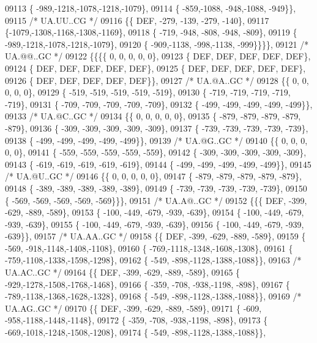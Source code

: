 \begin{DoxyCode}
09113 \{ -989,-1218,-1078,-1218,-1079\},
09114 \{ -859,-1088, -948,-1088, -949\}\},
09115 \textcolor{comment}{/* UA.UU..CG */}
09116 \{\{  DEF, -279, -139, -279, -140\},
09117 \{-1079,-1308,-1168,-1308,-1169\},
09118 \{ -719, -948, -808, -948, -809\},
09119 \{ -989,-1218,-1078,-1218,-1079\},
09120 \{ -909,-1138, -998,-1138, -999\}\}\}\},
09121 \textcolor{comment}{/* UA.@@..GC */}
09122 \{\{\{\{    0,    0,    0,    0,    0\},
09123 \{  DEF,  DEF,  DEF,  DEF,  DEF\},
09124 \{  DEF,  DEF,  DEF,  DEF,  DEF\},
09125 \{  DEF,  DEF,  DEF,  DEF,  DEF\},
09126 \{  DEF,  DEF,  DEF,  DEF,  DEF\}\},
09127 \textcolor{comment}{/* UA.@A..GC */}
09128 \{\{    0,    0,    0,    0,    0\},
09129 \{ -519, -519, -519, -519, -519\},
09130 \{ -719, -719, -719, -719, -719\},
09131 \{ -709, -709, -709, -709, -709\},
09132 \{ -499, -499, -499, -499, -499\}\},
09133 \textcolor{comment}{/* UA.@C..GC */}
09134 \{\{    0,    0,    0,    0,    0\},
09135 \{ -879, -879, -879, -879, -879\},
09136 \{ -309, -309, -309, -309, -309\},
09137 \{ -739, -739, -739, -739, -739\},
09138 \{ -499, -499, -499, -499, -499\}\},
09139 \textcolor{comment}{/* UA.@G..GC */}
09140 \{\{    0,    0,    0,    0,    0\},
09141 \{ -559, -559, -559, -559, -559\},
09142 \{ -309, -309, -309, -309, -309\},
09143 \{ -619, -619, -619, -619, -619\},
09144 \{ -499, -499, -499, -499, -499\}\},
09145 \textcolor{comment}{/* UA.@U..GC */}
09146 \{\{    0,    0,    0,    0,    0\},
09147 \{ -879, -879, -879, -879, -879\},
09148 \{ -389, -389, -389, -389, -389\},
09149 \{ -739, -739, -739, -739, -739\},
09150 \{ -569, -569, -569, -569, -569\}\}\},
09151 \textcolor{comment}{/* UA.A@..GC */}
09152 \{\{\{  DEF, -399, -629, -889, -589\},
09153 \{ -100, -449, -679, -939, -639\},
09154 \{ -100, -449, -679, -939, -639\},
09155 \{ -100, -449, -679, -939, -639\},
09156 \{ -100, -449, -679, -939, -639\}\},
09157 \textcolor{comment}{/* UA.AA..GC */}
09158 \{\{  DEF, -399, -629, -889, -589\},
09159 \{ -569, -918,-1148,-1408,-1108\},
09160 \{ -769,-1118,-1348,-1608,-1308\},
09161 \{ -759,-1108,-1338,-1598,-1298\},
09162 \{ -549, -898,-1128,-1388,-1088\}\},
09163 \textcolor{comment}{/* UA.AC..GC */}
09164 \{\{  DEF, -399, -629, -889, -589\},
09165 \{ -929,-1278,-1508,-1768,-1468\},
09166 \{ -359, -708, -938,-1198, -898\},
09167 \{ -789,-1138,-1368,-1628,-1328\},
09168 \{ -549, -898,-1128,-1388,-1088\}\},
09169 \textcolor{comment}{/* UA.AG..GC */}
09170 \{\{  DEF, -399, -629, -889, -589\},
09171 \{ -609, -958,-1188,-1448,-1148\},
09172 \{ -359, -708, -938,-1198, -898\},
09173 \{ -669,-1018,-1248,-1508,-1208\},
09174 \{ -549, -898,-1128,-1388,-1088\}\},

\end{DoxyCode}
